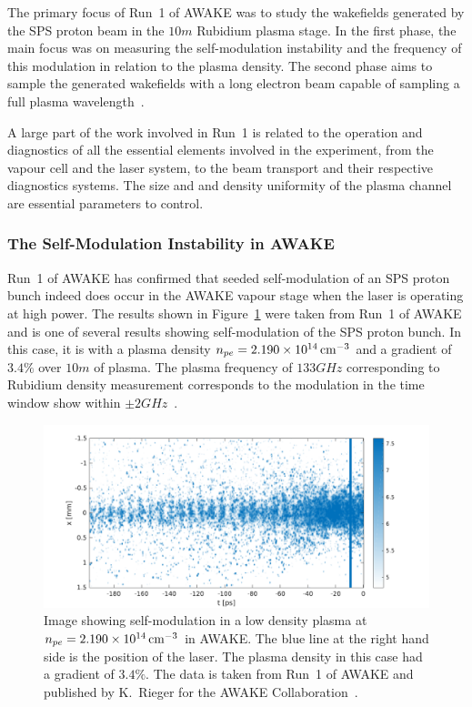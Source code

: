 The primary focus of Run~1 of AWAKE was to study the wakefields generated by the SPS proton beam in the $10\unit{m}$ Rubidium plasma stage.
In the first phase, the main focus was on measuring the self-modulation instability and the frequency of this modulation in relation to the plasma density.
The second phase aims to sample the generated wakefields with a long electron beam capable of sampling a full plasma wavelength~\cite{adli:2016a}.

A large part of the work involved in Run~1 is related to the operation and diagnostics of all the essential elements involved in the experiment, from the vapour cell and the laser system, to the beam transport and their respective diagnostics systems.
The size and and density uniformity of the plasma channel are essential parameters to control.

\subsubsection{The Self-Modulation Instability in AWAKE}
\label{WFA:SMI}

Run~1 of AWAKE has confirmed that seeded self-modulation of an SPS proton bunch indeed does occur in the AWAKE vapour stage when the laser is operating at high power.
The results shown in Figure~\ref{Fig:SMI:Results} were taken from Run~1 of AWAKE and is one of several results showing self-modulation of the SPS proton bunch.
In this case, it is with a plasma density $n_{pe} = 2.190\times 10^{14}\,\mathrm{cm}^{-3}$ and a gradient of $3.4\%$ over $10\unit{m}$ of plasma.
The plasma frequency of $133\unit{GHz}$ corresponding to Rubidium density measurement corresponds to the modulation in the time window show within $\pm 2\unit{GHz}$~\cite{awake_collaboration:2018a}.

\begin{figure}[hbt]
    \centering
    \includegraphics[width=0.99\linewidth,trim={0mm 0mm 0mm 0mm},clip]{figures/SMI-Rieger}
    \caption{\label{Fig:SMI:Results}
        Image showing self-modulation in a low density plasma at $n_{pe} = 2.190\times 10^{14}\,\mathrm{cm}^{-3}$ in AWAKE.
        The blue line at the right hand side is the position of the laser.
        The plasma density in this case had a gradient of $3.4\%$.
        The data is taken from Run~1 of AWAKE and published by K.~Rieger for the AWAKE Collaboration~\cite{adli:2018a}.
    }
\end{figure}

